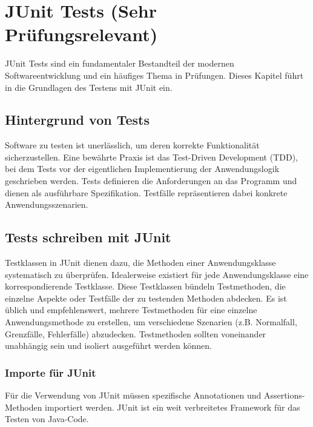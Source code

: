\chapter{JUnit Tests (Sehr Prüfungsrelevant)}

JUnit Tests sind ein fundamentaler Bestandteil der modernen Softwareentwicklung und ein häufiges Thema in Prüfungen. Dieses Kapitel führt in die Grundlagen des Testens mit JUnit ein.

\section{Hintergrund von Tests}
Software zu testen ist unerlässlich, um deren korrekte Funktionalität sicherzustellen. Eine bewährte Praxis ist das Test-Driven Development (TDD), bei dem Tests vor der eigentlichen Implementierung der Anwendungslogik geschrieben werden. Tests definieren die Anforderungen an das Programm und dienen als ausführbare Spezifikation. Testfälle repräsentieren dabei konkrete Anwendungsszenarien.

\section{Tests schreiben mit JUnit}
Testklassen in JUnit dienen dazu, die Methoden einer Anwendungsklasse systematisch zu überprüfen. Idealerweise existiert für jede Anwendungsklasse eine korrespondierende Testklasse. Diese Testklassen bündeln Testmethoden, die einzelne Aspekte oder Testfälle der zu testenden Methoden abdecken. Es ist üblich und empfehlenswert, mehrere Testmethoden für eine einzelne Anwendungsmethode zu erstellen, um verschiedene Szenarien (z.B. Normalfall, Grenzfälle, Fehlerfälle) abzudecken. Testmethoden sollten voneinander unabhängig sein und isoliert ausgeführt werden können.

\subsection{Importe für JUnit}
Für die Verwendung von JUnit müssen spezifische Annotationen und Assertions-Methoden importiert werden. JUnit ist ein weit verbreitetes Framework für das Testen von Java-Code.

